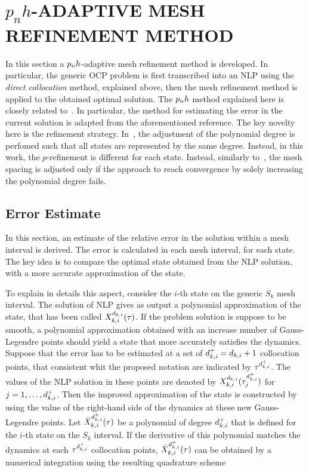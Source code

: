 \section*{$p_n h$-ADAPTIVE MESH REFINEMENT METHOD}

In this section a $p_{n}h$-adaptive mesh refinement method is developed. In particular, the generic OCP problem is first transcribed into an NLP using the \emph{direct collocation} method, explained above, then the mesh refinement method is applied to the obtained optimal solution.
The $p_{n}h$ method explained here is closely related to~\cite{Patterson:OCAM:2015}. In particular, the method for estimating the error in the current solution is adapted from the aforementioned reference. The key novelty here is the refinement strategy.
In~\cite{Patterson:OCAM:2015}, the adjustment of the polynomial degree is perfomed such that all states are represented by the same degree. Instead, in this work, the $p$-refinement is different for each state. Instead, similarly to~\cite{Patterson:OCAM:2015}, the mesh spacing is adjusted only if the approach to reach convergence by solely increasing the polynomial degree fails.


\subsection*{Error Estimate}

In this section, an estimate of the relative error in the solution within a mesh interval is derived. The error is calculated in each mesh interval, for each state.
The key idea is to compare the optimal state obtained from the NLP solution, with a more accurate approximation of the state.

To explain in details this aspect, consider the $i$-th state on the generic $S_k$ mesh interval.
The solution of NLP gives as output a polynomial approximation of the state, that has been called $X_{k,i}^{d_{k,i}} (\tau)$.
If the problem solution is suppose to be smooth, a polynomial approximation obtained with an increase number of Gauss-Legendre points should yield a state that more accurately satisfies the dynamics.
Suppose that the error has to be estimated at a set of  $d_{k,i}^{+} = d_{k,i} + 1$ collocation points, that consistent whit the proposed notation are indicated by $\tau^{{d}_{k,i}^{+}}$.
The values of the NLP solution in these points are denoted by $X_{k,i}^{d_{k,i}} (\tau^{{d}_{k,i}^{+}}_j)$ for $j = 1, \dots, d_{k,i}^{+}$.
Then the improved approximation of the state is constructed by using the value of the right-hand side of the dynamics at these new Gauss-Legendre points.
Let $\bar{X}_{k,i}^{d_{k,i}^{+}} (\tau)$ be a polynomial of degree $d_{k,i}^{+}$ that is defined for the $i$-th state on the $S_k$ interval. If the derivative of this polynomial matches the dynamics at each $\tau^{{d}_{k,i}^{+}}$ collocation points, $\bar{X}_{k,i}^{d_{k,i}^{+}} (\tau)$ can be obtained by a numerical integration using the resulting quadrature scheme

